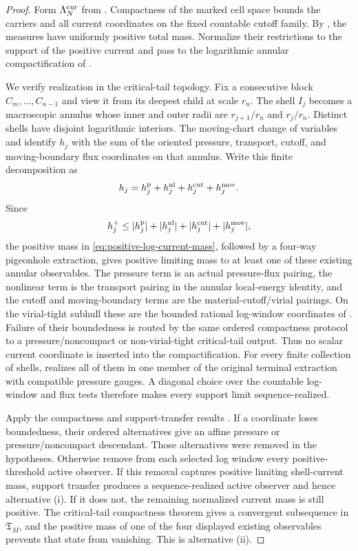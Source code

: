 \documentclass[11pt]{amsart}
\numberwithin{equation}{section}
\theoremstyle{plain}
\theoremstyle{definition}
\theoremstyle{remark}
\newcommand{\Tcrit}{\mathfrak T_M}
\begin{document}
\begin{proof}
Form \(\Lambda_N^{\rm cur}\) from
.  Compactness of the marked
cell space bounds the carriers and all current coordinates on the fixed
countable cutoff family.  By
, the measures have uniformly
positive total mass.  Normalize their restrictions to the support of the
positive current and pass to the logarithmic annular compactification of
.

We verify realization in the critical-tail topology.  Fix a consecutive block
\(C_m,\ldots,C_{n-1}\) and view it from its deepest child at scale \(r_n\).
The shell \(I_j\) becomes a macroscopic annulus whose inner and outer radii are
\(r_{j+1}/r_n\) and \(r_j/r_n\).  Distinct shells have disjoint logarithmic
interiors.  The moving-chart change of variables and
 identify \(h_j\) with the sum of
the oriented pressure, transport, cutoff, and moving-boundary flux coordinates
on that annulus.  Write this finite decomposition as
\[
 h_j=h_j^{\rm p}+h_j^{\rm nl}+h_j^{\rm cut}+h_j^{\rm mov}.
\]
Since
\[
 h_j^+\le |h_j^{\rm p}|+|h_j^{\rm nl}|
              +|h_j^{\rm cut}|+|h_j^{\rm mov}|,
\]
the positive mass in \eqref{eq:positive-log-current-mass}, followed by a
four-way pigeonhole extraction, gives positive limiting mass to at least one
of these existing annular observables.  The pressure term is an actual
pressure-flux pairing, the nonlinear term is the transport pairing in the
annular local-energy identity, and the cutoff and moving-boundary terms are
the material-cutoff/virial pairings.  On the virial-tight subhull these are
the bounded rational log-window coordinates of
.
Failure of their boundedness is routed by the same ordered compactness protocol
to a pressure/noncompact or non-virial-tight critical-tail output.  Thus no
scalar current coordinate is inserted into the compactification.  For every finite collection of
shells,  realizes all of them
in one member of the original terminal extraction with compatible pressure
gauges.  A diagonal choice over the countable log-window and flux tests
therefore makes every support limit sequence-realized.

Apply the compactness and support-transfer results
.
If a coordinate loses boundedness, their ordered alternatives give an affine
pressure or pressure/noncompact descendant.  Those alternatives were removed
in the hypotheses.  Otherwise remove from each selected log window every
positive-threshold active observer.  If this removal captures positive
limiting shell-current mass, support transfer produces a sequence-realized
active observer and hence alternative \textup{(i)}.  If it does not, the
remaining normalized current mass is still positive.  The critical-tail
compactness theorem gives a convergent subsequence in \(\Tcrit\), and the
positive mass of one of the four displayed existing observables prevents that
state from vanishing.  This is alternative \textup{(ii)}.


\end{proof}
\end{document}

